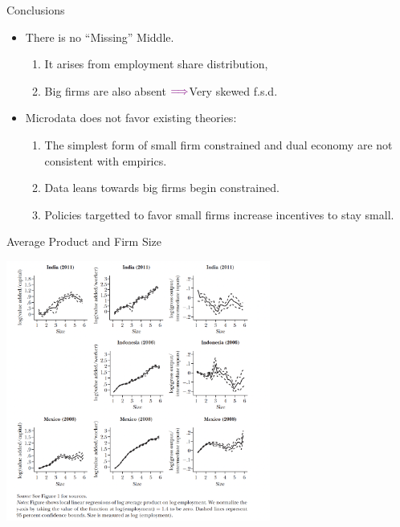 \documentclass[usenames,dvipsnames,aspectratio=169]{beamer}
\newcommand{\thus}{$\textcolor{violet}{\Longrightarrow}$}
\begin{document}
\begin{frame}{Conclusions}
    \begin{itemize}[label=\textcolor{violet}{$\blacktriangleright$}]
        \item There is no ``Missing'' Middle. 
        \begin{enumerate}[label=\textbf{\textcolor{violet}{\arabic*.}}]
            \item It arises from employment share distribution, 
            \item Big firms are also absent \thus Very skewed f.s.d. 
        \end{enumerate}
        \vfill
        \item Microdata does not favor existing theories:
        \begin{enumerate}[label=\textbf{\textcolor{violet}{\arabic*.}}]
            \item The simplest form of small firm constrained and dual economy are not consistent with empirics. 
            \item Data leans towards big firms begin constrained. 
            \item Policies targetted to favor small firms increase incentives to stay small. 
        \end{enumerate}
    \end{itemize} 
\end{frame}


\begin{frame}{Average Product and Firm Size}
\begin{center}
    \includegraphics[width=0.65\textwidth]{Figures/ReturnFirmSize.png}
\end{center}
\end{frame}
\end{document}
